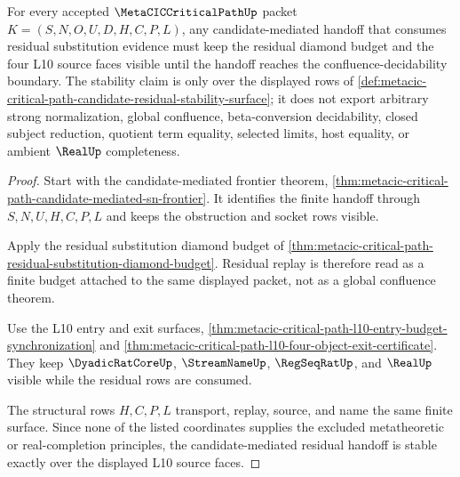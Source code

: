 \begin{theorem}
\label{thm:metacic-critical-path-candidate-residual-stability}
For every accepted $\MetaCICCriticalPathUp$ packet $K=(S,N,O,U,D,H,C,P,L)$, any candidate-mediated handoff that consumes residual substitution evidence must keep the residual diamond budget and the four L10 source faces visible until the handoff reaches the confluence-decidability boundary. The stability claim is only over the displayed rows of \autoref{def:metacic-critical-path-candidate-residual-stability-surface}; it does not export arbitrary strong normalization, global confluence, beta-conversion decidability, closed subject reduction, quotient term equality, selected limits, host equality, or ambient $\RealUp$ completeness.
\end{theorem}
\begin{proof}
Start with the candidate-mediated frontier theorem, \autoref{thm:metacic-critical-path-candidate-mediated-sn-frontier}. It identifies the finite handoff through $S,N,U,H,C,P,L$ and keeps the obstruction and socket rows visible.

Apply the residual substitution diamond budget of \autoref{thm:metacic-critical-path-residual-substitution-diamond-budget}. Residual replay is therefore read as a finite budget attached to the same displayed packet, not as a global confluence theorem.

Use the L10 entry and exit surfaces, \autoref{thm:metacic-critical-path-l10-entry-budget-synchronization} and \autoref{thm:metacic-critical-path-l10-four-object-exit-certificate}. They keep $\DyadicRatCoreUp$, $\StreamNameUp$, $\RegSeqRatUp$, and $\RealUp$ visible while the residual rows are consumed.

The structural rows $H,C,P,L$ transport, replay, source, and name the same finite surface. Since none of the listed coordinates supplies the excluded metatheoretic or real-completion principles, the candidate-mediated residual handoff is stable exactly over the displayed L10 source faces.
\end{proof}


